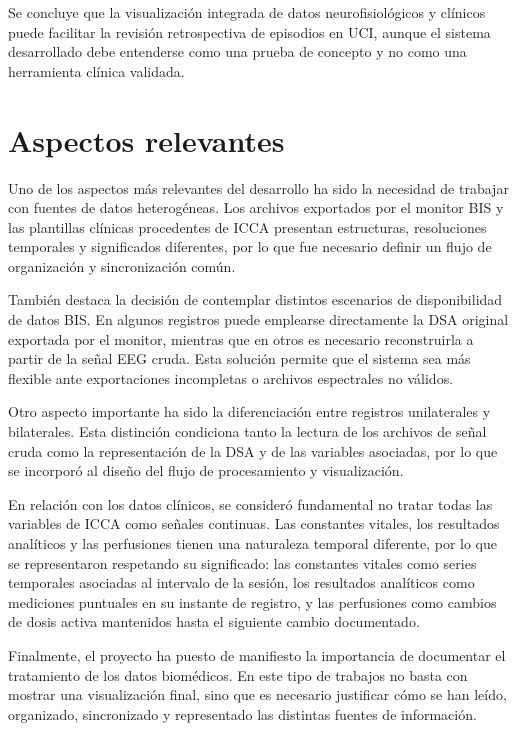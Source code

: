 \documentclass[
  spanish,
  a4paper,
  12pt,
  twoside]{memoir}
\begin{document}
Se concluye que la visualización integrada de datos neurofisiológicos y
clínicos puede facilitar la revisión retrospectiva de episodios en UCI,
aunque el sistema desarrollado debe entenderse como una prueba de
concepto y no como una herramienta clínica validada.

\section{Aspectos relevantes}\label{aspectos-relevantes}

Uno de los aspectos más relevantes del desarrollo ha sido la necesidad
de trabajar con fuentes de datos heterogéneas. Los archivos exportados
por el monitor BIS y las plantillas clínicas procedentes de ICCA
presentan estructuras, resoluciones temporales y significados
diferentes, por lo que fue necesario definir un flujo de organización y
sincronización común.

También destaca la decisión de contemplar distintos escenarios de
disponibilidad de datos BIS. En algunos registros puede emplearse
directamente la DSA original exportada por el monitor, mientras que en
otros es necesario reconstruirla a partir de la señal EEG cruda. Esta
solución permite que el sistema sea más flexible ante exportaciones
incompletas o archivos espectrales no válidos.

Otro aspecto importante ha sido la diferenciación entre registros
unilaterales y bilaterales. Esta distinción condiciona tanto la lectura
de los archivos de señal cruda como la representación de la DSA y de las
variables asociadas, por lo que se incorporó al diseño del flujo de
procesamiento y visualización.

En relación con los datos clínicos, se consideró fundamental no tratar
todas las variables de ICCA como señales continuas. Las constantes
vitales, los resultados analíticos y las perfusiones tienen una
naturaleza temporal diferente, por lo que se representaron respetando su
significado: las constantes vitales como series temporales asociadas al
intervalo de la sesión, los resultados analíticos como mediciones
puntuales en su instante de registro, y las perfusiones como cambios de
dosis activa mantenidos hasta el siguiente cambio documentado.

Finalmente, el proyecto ha puesto de manifiesto la importancia de
documentar el tratamiento de los datos biomédicos. En este tipo de
trabajos no basta con mostrar una visualización final, sino que es
necesario justificar cómo se han leído, organizado, sincronizado y
representado las distintas fuentes de información.
\end{document}
